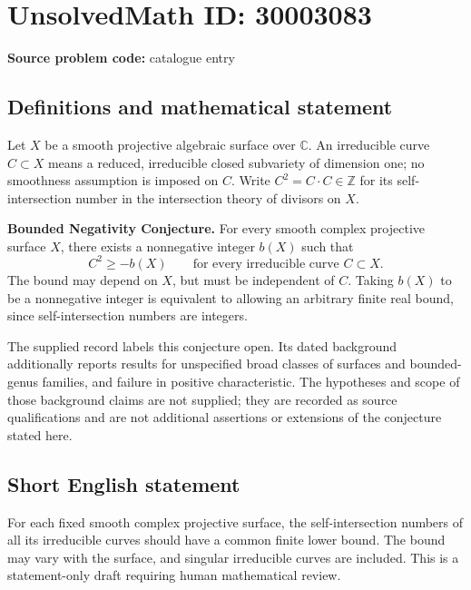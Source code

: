 \documentclass[11pt]{article}
\newcommand{\Z}{\mathbb{Z}}
\newcommand{\C}{\mathbb{C}}
\begin{document}
\section*{UnsolvedMath ID: 30003083}
\textbf{Source problem code:} catalogue entry
\subsection{Definitions and mathematical statement}
Let \(X\) be a smooth projective algebraic surface over \(\C\). An irreducible curve \(C\subset X\) means a reduced, irreducible closed subvariety of dimension one; no smoothness assumption is imposed on \(C\). Write \(C^2=C\cdot C\in\Z\) for its self-intersection number in the intersection theory of divisors on \(X\).

\textbf{Bounded Negativity Conjecture.} For every smooth complex projective surface \(X\), there exists a nonnegative integer \(b(X)\) such that
\[
C^2\geq -b(X)
\qquad\text{for every irreducible curve }C\subset X.
\]
The bound may depend on \(X\), but must be independent of \(C\). Taking \(b(X)\) to be a nonnegative integer is equivalent to allowing an arbitrary finite real bound, since self-intersection numbers are integers.

The supplied record labels this conjecture open. Its dated background additionally reports results for unspecified broad classes of surfaces and bounded-genus families, and failure in positive characteristic. The hypotheses and scope of those background claims are not supplied; they are recorded as source qualifications and are not additional assertions or extensions of the conjecture stated here.
\subsection{Short English statement}
For each fixed smooth complex projective surface, the self-intersection numbers of all its irreducible curves should have a common finite lower bound. The bound may vary with the surface, and singular irreducible curves are included. This is a statement-only draft requiring human mathematical review.
\end{document}
